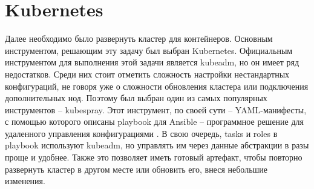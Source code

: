 \section{Kubernetes}
\label{sec:k8s}

Далее необходимо было развернуть кластер для контейнеров. Основным инструментом, решающим эту задачу был выбран Kubernetes.
Официальным инструментом для выполнения этой задачи является kubeadm,
но он имеет ряд недостатков. Среди них стоит отметить сложность настройки нестандартных конфигураций, не говоря уже о сложности обновления кластера или подключения дополнительных нод. Поэтому был выбран один из самых популярных инструментов -- kubespray.
Этот инструмент, по своей сути -- YAML-манифесты,
с помощью которого описаны playbook
для Ansible -- программное решение для удаленного управления конфигурациями \cite{def:ansible}.
В свою очередь, tasks
и roles
в playbook используют kubeadm, но управлять им через данные абстракции в разы проще и удобнее. Также это позволяет иметь готовый артефакт, чтобы повторно развернуть кластер в другом месте или обновить его, внеся небольшие изменения.

